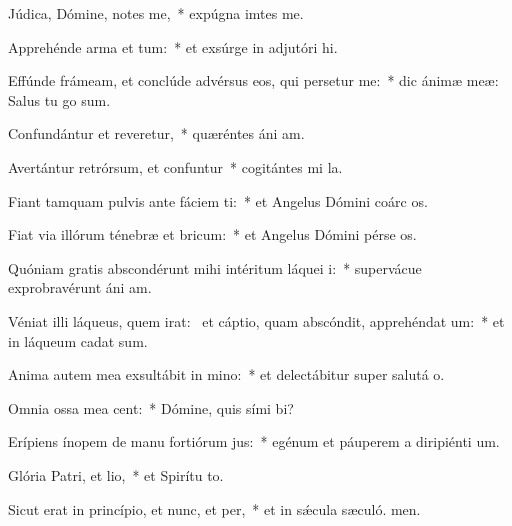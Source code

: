 \item Júdica, Dómine, notes me,~* expúgna imtes me.
\item Apprehénde arma et tum:~* et exsúrge in adjutóri hi.
\item Effúnde frámeam, et conclúde advérsus eos, qui persetur me:~* dic ánimæ meæ: Salus tu go sum.
\item Confundántur et reveretur,~* quæréntes áni am.
\item Avertántur retrórsum, et confuntur~* cogitántes mi la.
\item Fiant tamquam pulvis ante fáciem ti:~* et Angelus Dómini coárc os.
\item Fiat via illórum ténebræ et bricum:~* et Angelus Dómini pérse os.
\item Quóniam gratis abscondérunt mihi intéritum láquei i:~* supervácue exprobravérunt áni am.
\item Véniat illi láqueus, quem irat:~\pscross{} et cáptio, quam abscóndit, apprehéndat um:~* et in láqueum cadat  sum.
\item Anima autem mea exsultábit in mino:~* et delectábitur super salutá o.
\item Omnia ossa mea cent:~* Dómine, quis sími bi?
\item Erípiens ínopem de manu fortiórum jus:~* egénum et páuperem a diripiénti um.
\item Glória Patri, et lio,~* et Spirítu to.
\item Sicut erat in princípio, et nunc, et per,~* et in sǽcula sæculó. men.
